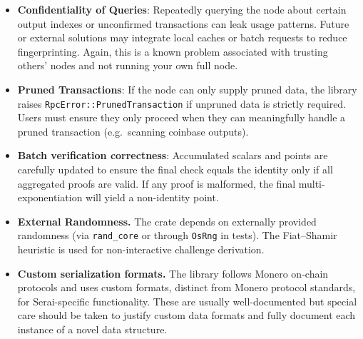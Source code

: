 \documentclass[12pt,a4paper]{article}
\begin{document}
\begin{itemize}
    \item \textbf{Confidentiality of Queries}: Repeatedly querying the node
    about certain output indexes or unconfirmed transactions can leak usage
    patterns.  Future or external solutions may integrate local caches or batch
    requests to reduce fingerprinting. Again, this is a known problem associated with trusting others' nodes and not running your own full node.


    \item \textbf{Pruned Transactions}: If the node can only supply pruned
    data, the library raises
    \texttt{RpcError::PrunedTransaction} if unpruned data is strictly required.
    Users must ensure they only proceed when they can meaningfully handle a
    pruned transaction (e.g.\ scanning coinbase outputs).


    \item \textbf{Batch verification correctness}: Accumulated scalars and points are carefully updated to ensure the final check equals the identity only if all aggregated proofs are valid.  If any proof is malformed, the final multi-exponentiation will yield a non-identity point. %
    \item \textbf{External Randomness.} The crate depends on externally provided randomness (via \texttt{rand\_core} or through \texttt{OsRng} in tests).  The Fiat--Shamir heuristic is used for non-interactive challenge derivation. %

    \item \textbf{Custom serialization formats.} The library follows Monero on-chain protocols and uses custom formats, distinct from Monero protocol standards, for Serai-specific functionality.  These are usually well-documented but special care should be taken to justify custom data formats and fully document each instance of a novel data structure.
\end{itemize}
\end{document}
